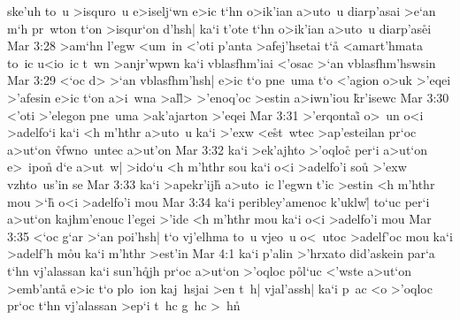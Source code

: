 ske'uh
to~u
>isquro~u
e>iselj`wn
e>ic
t`hn
o>ik'ian
a>uto~u
diarp'asai
>e`an
m`h
pr~wton
t`on
>isqur`on
d'hsh|
ka`i
t'ote
t`hn
o>ik'ian
a>uto~u
diarp'as\r{e}i\bibvsend
{}
\vs Mar 3:28
>am`hn
l'egw
<um~in
<'oti
p'anta
>afej'hsetai
t`a\r{}
<amart'hmata
to~ic
u<io~ic
t~wn
>anjr'wpwn
ka`i
vblasfhm'iai
<'osac
>`an
vblasfhm'hswsin\bibvsend
\vs Mar 3:29
<`oc
d>
>`an
vblasfhm'hsh|
e>ic
t`o
pne~uma
t`o
<'agion
o>uk
>'eqei
>'afesin
e>ic
t`on
a>i~wna
>al\r{l}>
>'enoq'oc
>estin
a>iwn'iou
\r{k}r'isewc\bibvsend
{}
\vs Mar 3:30
<'oti
>'elegon
pne~uma
>ak'ajarton
>'eqei\bibvsend
\vs Mar 3:31
>'erqontai\r{}
o>~un
o<i
>adelfo`i
ka`i
<h
m'hthr
a>uto~u
ka`i
>'exw
<e\r{s}t~wtec
>ap'esteilan
pr`oc
a>ut`on
\r{vf}wno~untec
a>ut'on\bibvsend
\vs Mar 3:32
ka`i
>ek'ajhto
>'oqloc\r{}
per`i
a>ut`on
e>~ipon\r{}
d`e
a>ut~w|
>ido`u
<h
m'hthr
sou
ka`i
o<i
>adelfo'i
so\r{u}
>'exw
vzhto~us'in
se\bibvsend
\vs Mar 3:33
ka`i
>apekr'ijh\r{}
a>uto~ic
l'egwn
t'ic
>estin
<h
m'hthr
mou
>`h\r{}
o<i
>adelfo'i
mou\bibvsend
\vs Mar 3:34
ka`i
peribley'amenoc
k'uklw|\r{}
to`uc
per`i
a>ut`on
kajhm'enouc
l'egei
>'ide
<h
m'hthr
mou
ka`i
o<i
>adelfo'i
mou\bibvsend
\vs Mar 3:35
<`oc
g`ar
>`an
poi'hsh|
t`o
vj'elhma
to~u
vjeo~u
o<~utoc
>adelf'oc
mou
ka`i
>adelf'h
m\r{o}u
ka`i
m'hthr
>est'in\bibvsend
\vs Mar 4:1
ka`i
p'alin
>'hrxato
did'askein
par`a
t`hn
vj'alassan
ka`i
su\-n'h\r{q}\-jh
pr`oc
a>ut`on
>'oqloc
p\r{o}l`uc
<'wste
a>ut`on
>emb'anta\r{}
e>ic
t`o
plo~ion
kaj~hsjai
>en
t~h|
vjal'assh|
ka`i
p~ac
<o
>'oqloc
pr`oc
t`hn
vj'alassan
>ep`i
t~hc
g~hc
>~h\r{n}\bibvsend
{}
